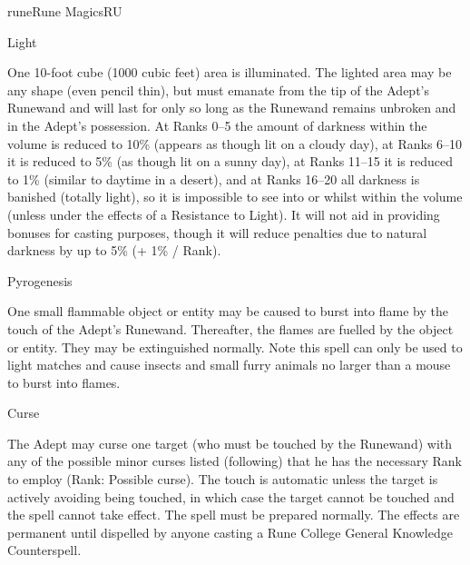 \begin{college}[1.1]{rune}{Rune Magics}{RU}
\begin{spell}[G-3]{Light}

\begin{effects}
One 10-foot cube (1000 cubic feet) area is illuminated.  The lighted
area may be any shape (even pencil thin), but must emanate from the
tip of the Adept's Runewand and will last for only so long as the
Runewand remains unbroken and in the Adept's possession.  At Ranks
0--5 the amount of darkness within the volume is reduced to 10\%
(appears as though lit on a cloudy day), at Ranks 6--10 it is reduced
to 5\% (as though lit on a sunny day), at Ranks 11--15 it is reduced
to 1\% (similar to daytime in a desert), and at Ranks 16--20 all
darkness is banished (\ie totally light), so it is impossible to see
into or whilst within the volume (unless under the effects of a
Resistance to Light).  It will not aid in providing bonuses for
casting purposes, though it will reduce penalties due to natural
darkness by up to 5\% (+ 1\% / Rank).

\end{effects}
\end{spell}

\begin{spell}[G-4]{Pyrogenesis}

\begin{effects}
One small flammable object or entity may be caused to burst into flame
by the touch of the Adept's Runewand.  Thereafter, the flames are
fuelled by the object or entity.  They may be extinguished
normally. Note this spell can only be used to light matches and cause
insects and small furry animals no larger than a mouse to burst into
flames.
\end{effects}
\end{spell}

\begin{spell}[G-5]{Curse}
\begin{effects}
The Adept may curse one target (who must be touched by the Runewand)
with any of the possible minor curses listed (following) that he has
the necessary Rank to employ (Rank: Possible curse). The touch is
automatic unless the target is actively avoiding being touched, in
which case the target cannot be touched and the spell cannot take
effect.  The spell must be prepared normally.  The effects are
permanent until dispelled by anyone casting a Rune College General
Knowledge Counterspell.


\end{effects}
\end{spell}
\end{college}
